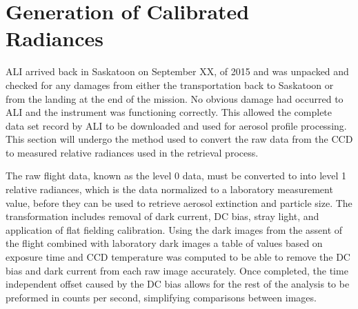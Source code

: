 \section{Generation of Calibrated Radiances}
\label{sec:5.2:CalibratedRadiances}

ALI arrived back in Saskatoon on September XX, of 2015 and was unpacked and checked for any damages from either the transportation back to Saskatoon or from the landing at the end of the mission. No obvious damage had occurred to ALI and the instrument was functioning correctly. This allowed the complete data set record by ALI to be downloaded and used for aerosol profile processing. This section will undergo the method used to convert the raw data from the CCD to measured relative radiances used in the retrieval process.

The raw flight data, known as the level 0 data, must be converted to into level 1 relative radiances, which is the data normalized to a laboratory measurement value, before they can be used to retrieve aerosol extinction and particle size. The transformation includes removal of dark current, DC bias, stray light, and application of flat fielding calibration. Using the dark images from the assent of the flight combined with laboratory dark images a table of values based on exposure time and CCD temperature was computed to be able to remove the DC bias and dark current from each raw image accurately. Once completed, the time independent offset caused by the DC bias allows for the rest of the analysis to be preformed in counts per second, simplifying comparisons between images. %

